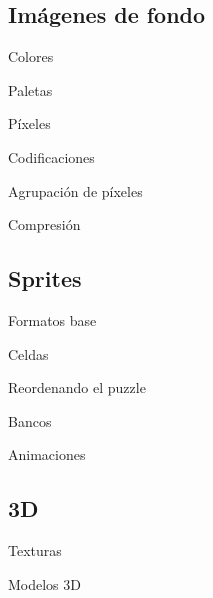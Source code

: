 \subsection{Imágenes de fondo}
\begin{frame}{Colores}
\end{frame}

\begin{frame}{Paletas}
\end{frame}

\begin{frame}{Píxeles}
\end{frame}

\begin{frame}{Codificaciones}
\end{frame}

\begin{frame}{Agrupación de píxeles}
\end{frame}

\begin{frame}{Compresión}
\end{frame}

\subsection{Sprites}
\begin{frame}{Formatos base}
\end{frame}

\begin{frame}{Celdas}
\end{frame}

\begin{frame}{Reordenando el puzzle}
\end{frame}

\begin{frame}{Bancos}
\end{frame}

\begin{frame}{Animaciones}
\end{frame}

\subsection{3D}
\begin{frame}{Texturas}
\end{frame}

\begin{frame}{Modelos 3D}
\end{frame}

